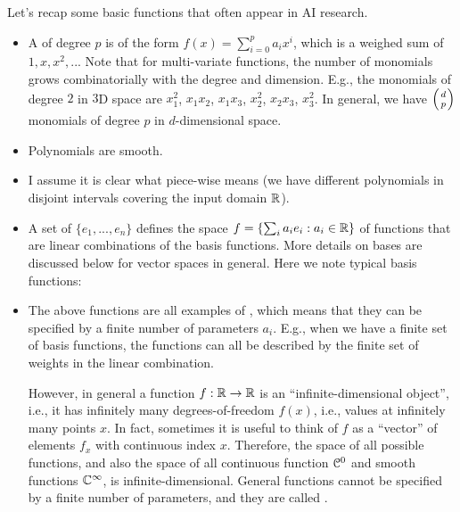 Let's recap some basic functions that often appear in AI research.
\begin{itemize}
\item A  of degree $p$ is of the form $f(x) = \sum_{i=0}^p a_i x^i$, which is a weighed sum of  $1, x, x^2,..$. Note that for multi-variate functions, the number of monomials grows combinatorially with the degree and dimension. E.g., the monomials of degree $2$ in $3$D space are $x_1^2$, $x_1 x_2$, $x_1 x_3$, $x_2^2$, $x_2 x_3$, $x_3^2$. In general, we have $\left(d \atop p\right)$ monomials of degree $p$ in $d$-dimensional space.
\item Polynomials are smooth.
\item I assume it is clear what piece-wise means (we have different polynomials in disjoint intervals covering the input domain ${\mathbb{R}}$).

\item A set of  $\{e_1,...,e_n\}$  defines the space $f = \{ \sum_i a_i e_i : a_i \in {\mathbb{R}} \}$ of functions that are linear combinations of the basis functions. More details on bases are discussed below for vector spaces in general. Here we note typical basis functions:

\item The above functions are all examples of , which means that they can be specified by a finite number of parameters $a_i$. E.g., when we have a finite set of basis functions, the functions can all be described by the finite set of weights in the linear combination.

However, in general a function $f:{\mathbb{R}} \to {\mathbb{R}}$ is an ``infinite-dimensional object'', i.e., it has infinitely many degrees-of-freedom $f(x)$, i.e., values at infinitely many points $x$. In fact, sometimes it is useful to think of $f$ as a ``vector'' of elements $f_x$ with continuous index $x$. Therefore, the space of all possible functions, and also the space of all continuous function ${\cal C}^0$ and smooth functions ${\mathbb{C}}^\infty$, is infinite-dimensional. General functions cannot be specified by a finite number of parameters, and they are called .


\end{itemize}

